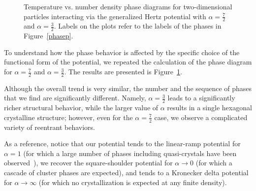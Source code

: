 {\begin{figure}
\begin{center}
	\end{center}
	\caption[Temperature vs. number density for $\alpha = \frac{3}{2}$ and $\alpha = \frac{7}{2}$]{Temperature vs. number density phase diagrams for two-dimensional particles interacting via   the generalized Hertz potential  with  $\alpha =\frac{7}{2}$ and   $\alpha=\frac{3}{2}$.  
Labels on the plots refer to the labels of the phases in Figure~\ref{phasep}.}\label{phased} 	
\end{figure}

To understand how the phase behavior is affected by the specific choice of the functional 
form of the potential, we repeated the calculation of the phase diagram for 
$\alpha=\frac{7}{2}$ and $\alpha=\frac{3}{2}$.
The results are presented is Figure~\ref{phased}.

Although the overall
trend is very similar, the number and the sequence of phases that we find are significantly different.
Namely, $\alpha=\frac{3}{2}$ leads to a significantly richer structural behavior, while the 
larger value of $\alpha$ results in a single hexagonal crystalline structure; however, even for the $\alpha = \frac{7}{2}$ case, we observe a complicated variety of reentrant behaviors.

As a reference, notice  that our potential tends  to the linear-ramp potential for $\alpha=1$
(for which a large number of phases including quasi-crystals have been observed~\cite{jagla}), we recover the square-shoulder potential for $\alpha\rightarrow 0$
(for which a cascade of cluster phases are expected), and tends to a Kronecker delta potential
for  $\alpha\rightarrow\infty$ (for which no crystallization is expected at any finite density).

}

